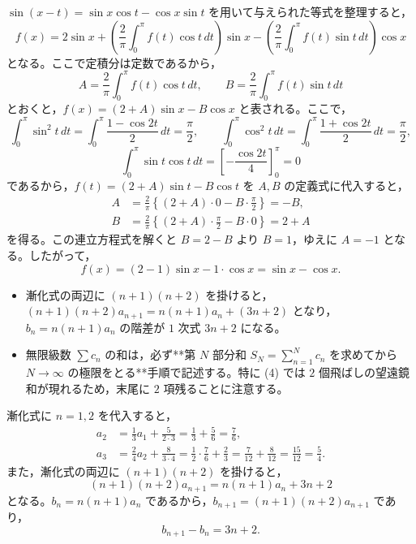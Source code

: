 
$\sin(x-t)=\sin x\cos t-\cos x\sin t$ を用いて与えられた等式を整理すると，
\[
  f(x) = 2\sin x + \left(\frac{2}{\pi}\int_{0}^{\pi}f(t)\cos t\,dt\right)\sin x - \left(\frac{2}{\pi}\int_{0}^{\pi}f(t)\sin t\,dt\right)\cos x
\]
となる。ここで定積分は定数であるから，
\[
  A = \frac{2}{\pi}\int_{0}^{\pi}f(t)\cos t\,dt,\qquad
  B = \frac{2}{\pi}\int_{0}^{\pi}f(t)\sin t\,dt
\]
とおくと，$f(x)=(2+A)\sin x-B\cos x$ と表される。ここで，
\[
  \int_{0}^{\pi}\sin^{2}t\,dt = \int_{0}^{\pi}\frac{1-\cos 2t}{2}\,dt = \frac{\pi}{2},\qquad
  \int_{0}^{\pi}\cos^{2}t\,dt = \int_{0}^{\pi}\frac{1+\cos 2t}{2}\,dt = \frac{\pi}{2},
\]
\[
  \int_{0}^{\pi}\sin t\cos t\,dt = \left[-\frac{\cos 2t}{4}\right]_{0}^{\pi} = 0
\]
であるから，$f(t)=(2+A)\sin t-B\cos t$ を $A, B$ の定義式に代入すると，
\begin{align*}
  A &= \frac{2}{\pi}\left\{(2+A)\cdot 0 - B\cdot\frac{\pi}{2}\right\} = -B,\\
  B &= \frac{2}{\pi}\left\{(2+A)\cdot\frac{\pi}{2} - B\cdot 0\right\} = 2+A
\end{align*}
を得る。この連立方程式を解くと $B=2-B$ より $B=1$，ゆえに $A=-1$ となる。したがって，
\[
  f(x) = (2-1)\sin x - 1\cdot\cos x = \sin x - \cos x.
\]



\begin{itemize}[leftmargin=1.6em,itemsep=2pt,topsep=2pt]
  \item[(1)] 漸化式の両辺に $(n+1)(n+2)$ を掛けると，$(n+1)(n+2)a_{n+1}=n(n+1)a_{n}+(3n+2)$ となり，$b_{n}=n(n+1)a_{n}$ の階差が $1$ 次式 $3n+2$ になる。
  \item[(3)(4)] 無限級数 $\sum c_{n}$ の和は，必ず**第 $N$ 部分和 $S_{N}=\sum_{n=1}^{N}c_{n}$ を求めてから $N\to\infty$ の極限をとる**手順で記述する。特に (4) では $2$ 個飛ばしの望遠鏡和が現れるため，末尾に $2$ 項残ることに注意する。
\end{itemize}

漸化式に $n=1, 2$ を代入すると，
\begin{align*}
  a_{2} &= \frac{1}{3}a_{1} + \frac{5}{2\cdot 3} = \frac{1}{3} + \frac{5}{6} = \frac{7}{6},\\
  a_{3} &= \frac{2}{4}a_{2} + \frac{8}{3\cdot 4} = \frac{1}{2}\cdot\frac{7}{6} + \frac{2}{3} = \frac{7}{12} + \frac{8}{12} = \frac{15}{12} = \frac{5}{4}.
\end{align*}
また，漸化式の両辺に $(n+1)(n+2)$ を掛けると，
\[
  (n+1)(n+2)a_{n+1} = n(n+1)a_{n} + 3n + 2
\]
となる。$b_{n}=n(n+1)a_{n}$ であるから，$b_{n+1}=(n+1)(n+2)a_{n+1}$ であり，
\[
  b_{n+1} - b_{n} = 3n + 2.
\]

